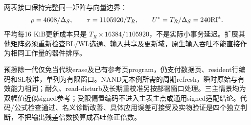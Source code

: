 两表接口保持完整同一矩阵与向量边界：
\[
 \rho=4608/\Delta_S,\qquad \tau=1105920/T_R,\qquad
 U^*=T_R/\Delta_S=240\mathrm{RI}^*.
\]
平均每16 KiB更新成本只是 $T_R\times16384/1105920$，不是实际小事务延迟。扩展其他矩阵必须重新检查BL/WL选通、输入共享及更新域，原生输入吞吐不能直接作为相同工作量的器件排序。




预擦除一代仅免当代块erase及已有参考页program，仍支付数据页、resident行编码和SL校准，单列为有限窗口。NAND无本例所需的周期refresh，瞬时原始与有效能力相同；耐久、read-disturb及长期重校准另按部署窗口处理。三主情景均为双幅值近似signed参考；受限偏置编码不进入主表主点或通用signed适配结论。代码/公式检查通过、名义诊断改善、具体应用误差可接受及实物验证是四个独立判断，不把输出残差倍数换算成吞吐修正倍数。
